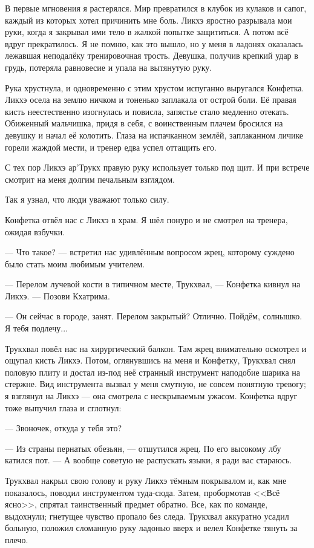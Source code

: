 В первые мгновения я растерялся.
Мир превратился в клубок из кулаков и сапог, каждый из которых хотел причинить мне боль.
Ликхэ яростно разрывала мои руки, когда я закрывал ими тело в жалкой попытке защититься.
А потом всё вдруг прекратилось.
Я не помню, как это вышло, но у меня в ладонях оказалась лежавшая неподалёку тренировочная трость.
Девушка, получив крепкий удар в грудь, потеряла равновесие и упала на вытянутую руку.

Рука хрустнула, и одновременно с этим хрустом испуганно выругался Конфетка.
Ликхэ осела на землю ничком и тоненько заплакала от острой боли.
Её правая кисть неестественно изогнулась и повисла, запястье стало медленно отекать.
Обиженный мальчишка, придя в себя, с воинственным плачем бросился на девушку и начал её колотить.
Глаза на испачканном землёй, заплаканном личике горели жаждой мести, и тренер едва успел оттащить его.

С тех пор Ликхэ ар'Трукх правую руку использует только под щит.
И при встрече смотрит на меня долгим печальным взглядом.

Так я узнал, что люди уважают только силу.

\asterism

Конфетка отвёл нас с Ликхэ в храм.
Я шёл понуро и не смотрел на тренера, ожидая взбучки.

--- Что такое? --- встретил нас удивлённым вопросом жрец, которому суждено было стать моим любимым учителем.

--- Перелом лучевой кости в типичном месте, Трукхвал, --- Конфетка кивнул на Ликхэ.
--- Позови Кхатрима.

--- Он сейчас в городе, занят.
Перелом закрытый?
Отлично.
Пойдём, солнышко.
Я тебя подлечу...

Трукхвал повёл нас на хирургический балкон.
Там жрец внимательно осмотрел и ощупал кисть Ликхэ.
Потом, оглянувшись на меня и Конфетку, Трукхвал снял половую плиту и достал из-под неё странный инструмент наподобие шарика на стержне.
Вид инструмента вызвал у меня смутную, не совсем понятную тревогу;
я взглянул на Ликхэ --- она смотрела с нескрываемым ужасом.
Конфетка вдруг тоже выпучил глаза и сглотнул:

--- Звоночек, откуда у тебя это?

--- Из страны пернатых обезьян, --- отшутился жрец.
По его высокому лбу катился пот.
--- А вообще советую не распускать языки, я ради вас стараюсь.

Трукхвал накрыл свою голову и руку Ликхэ тёмным покрывалом и, как мне показалось, поводил инструментом туда-сюда.
Затем, пробормотав <<Всё ясно>>, спрятал таинственный предмет обратно.
Все, как по команде, выдохнули;
гнетущее чувство пропало без следа.
Трукхвал аккуратно усадил больную, положил сломанную руку ладонью вверх и велел Конфетке тянуть за плечо.

